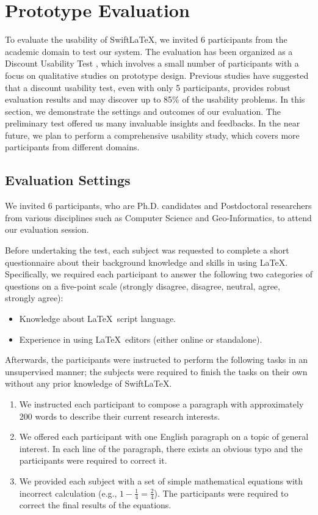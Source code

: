 \documentclass[sigconf]{acmart}
\begin{document}
\section{Prototype Evaluation}\label{sect:eve}
To evaluate the usability of SwiftLaTeX, we invited 6 participants from the academic domain to test our system. 
The evaluation has been organized as a Discount Usability Test \cite{nielsen1989usability}, which involves a small number of participants with a focus on qualitative studies on prototype design. Previous studies \cite{nielsen2015you}\cite{nielsen2009discount} have suggested that a discount usability test, even with only 5 participants, provides robust evaluation results and may discover up to 85\% of the 
usability problems. In this section, we demonstrate the settings and outcomes of our evaluation. 
The preliminary test offered us many invaluable insights and feedbacks.
In the near future, we plan to perform a comprehensive usability study, which covers more participants from different domains.

\subsection{Evaluation Settings}
We invited 6 participants, who are Ph.D. candidates and Postdoctoral researchers from various disciplines such as Computer Science and Geo-Informatics, to attend our evaluation session.

Before undertaking the test, each subject was requested to complete a short questionnaire about their background knowledge and skills in using \LaTeX. Specifically, we required each participant to answer the following two categories of questions on a five-point scale (strongly disagree, disagree, neutral, agree, strongly agree):
\begin{itemize}
\item Knowledge about \LaTeX\ script language.
\item Experience in using \LaTeX\ editors (either online or standalone).
\end{itemize}

Afterwards, the participants were instructed to perform the following tasks in an unsupervised manner; the subjects were required to finish the tasks on their own without any prior knowledge of SwiftLaTeX.
\begin{enumerate}
	\item We instructed each participant to compose a paragraph with approximately 200 words to describe their current research interests. 
	\item We offered each participant with one English paragraph on a topic of general interest. In each line of the paragraph, there exists an obvious typo and the participants were required to correct it.
	\item We provided each subject with a set of simple mathematical equations with incorrect calculation (e.g., $1 - \frac{1}{4} = \frac{2}{4}$). The participants were required to correct the final results of the equations.
\end{enumerate}
\end{document}

